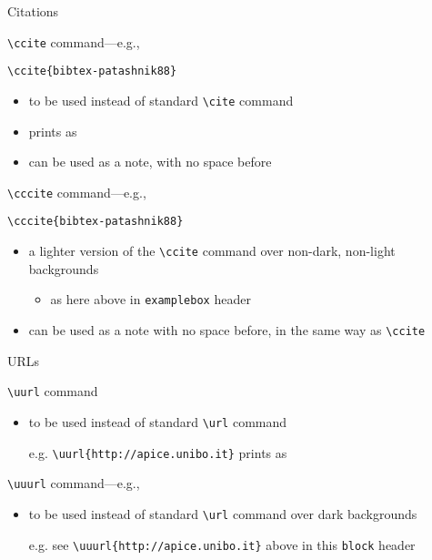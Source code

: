 \documentclass[presentation]{beamer}\mode<presentation>{\usetheme{AMSBolognaFC}}
\begin{document}
\begin{frame}{Citations}
%
\begin{alertblock}{\texttt{\textbackslash{}ccite} command---e.g., }
\begin{verbatim}
\ccite{bibtex-patashnik88}
\end{verbatim}
\begin{itemize}
	\item to be used instead of standard \texttt{\textbackslash{}cite} command
	\item prints as 
	\item can be used as a note, with no space before
\end{itemize}
\end{alertblock}
%
\begin{exampleblock}{\texttt{\textbackslash{}cccite} command---e.g., }
\begin{verbatim}
\cccite{bibtex-patashnik88}
\end{verbatim}
\begin{itemize}
	\item a lighter version of the \texttt{\textbackslash{}ccite} command over non-dark, non-light backgrounds
	\begin{itemize}
		\item as here above in \texttt{examplebox} header
	\end{itemize}
	\item can be used as a note with no space before, in the same way as \texttt{\textbackslash{}ccite}
\end{itemize}
\end{exampleblock}
%
\end{frame}

\begin{frame}[c,fragile]{URLs}
%
\begin{block}{\texttt{\textbackslash{}uurl} command}
\begin{itemize}
	\item to be used instead of standard \texttt{\textbackslash{}url} command
	\item[e.g.] \verb|| prints as \uurl{http://apice.unibo.it}
\end{itemize}
\end{block}
%
\begin{block}{\texttt{\textbackslash{}uuurl} command---e.g., }
\begin{itemize}
	\item to be used instead of standard \texttt{\textbackslash{}url} command over dark backgrounds
	\item[e.g.] see \verb|\uuurl{http://apice.unibo.it}| above in this \texttt{block} header
\end{itemize}
\end{block}
%
\end{frame}
\end{document}
